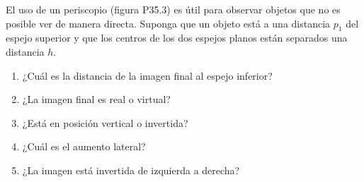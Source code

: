 \item El uso de un periscopio (figura P35.3) es útil para observar objetos que no es posible ver de manera directa. Suponga que un objeto está a una distancia $p_1$ del espejo superior y que los centros de los dos espejos planos están separados una distancia $h$.
\begin{enumerate}
    \item ¿Cuál es la distancia de la imagen final al espejo inferior?
    \item ¿La imagen final es real o virtual?
    \item ¿Está en posición vertical o invertida?
    \item ¿Cuál es el aumento lateral?
    \item ¿La imagen está invertida de izquierda a derecha?
\end{enumerate}